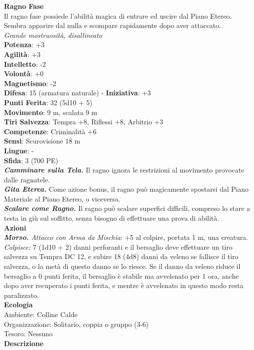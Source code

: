\begin{multicols}{2}
\medskip\textbf{Ragno Fase}\\
Il ragno fase possiede l'abilità magica di entrare ed uscire dal Piano Etereo. Sembra apparire dal nulla e scompare rapidamente dopo aver attaccato.\\
\emph{Grande mostruosità, disallineato}\\
\textbf{Potenza}: +3\\
\textbf{Agilità}: +3\\
\textbf{Intelletto}: -2\\
\textbf{Volontà}: +0\\
\textbf{Magnetismo}: -2\\
\textbf{Difesa}: 15 (armatura naturale) - \textbf{Iniziativa}: +3\\
\textbf{Punti Ferita}: 32 (5d10 + 5)\\
\textbf{Movimento}: 9 m, scalata 9 m\\
\textbf{Tiri Salvezza}: Tempra +8, Riflessi +8, Arbitrio +3 \\
\textbf{Competenze}: Criminalità +6\\
\textbf{Sensi}: Scurovisione 18 m\\
\textbf{Lingue}: -\\
\textbf{Sfida}: 3 (700 PE)\smallskip\\
\emph{\textbf{Camminare sulla Tela.}} Il ragno ignora le restrizioni al movimento provocate dalle ragnatele.\\
\emph{\textbf{Gita Eterea.}} Come azione bonus, il ragno può magicamente spostarsi dal Piano Materiale al Piano Etereo, o viceversa.\\
\emph{\textbf{Scalare come Ragno.}} Il ragno può scalare superfici difficili, compreso lo stare a testa in giù sul soffitto, senza bisogno di effettuare una prova di abilità. \\
\smallskip\textbf{Azioni}\\
\emph{\textbf{Morso.} Attacco con Arma da Mischia}: +5 al colpire, portata 1 m, una creatura.\\
\emph{Colpisce:} 7 (1d10 + 2) danni perforanti e il bersaglio deve effettuare un tiro salvezza su Tempra DC  12, e subire 18 (4d8) danni da veleno se fallisce il tiro salvezza, o la metà di questo danno se lo riesce. Se il danno da veleno riduce il bersaglio a 0 punti ferita, il bersaglio è stabile ma avvelenato per 1 ora, anche dopo aver recuperato i punti ferita, e mentre è avvelenato in questo modo resta paralizzato.\\
\textbf{Ecologia}\\
Ambiente: Colline Calde\\
Organizzazione: Solitario, coppia o gruppo (3-6)\\
Tesoro: Nessuno\\
\textbf{Descrizione}\\


\end{multicols}
